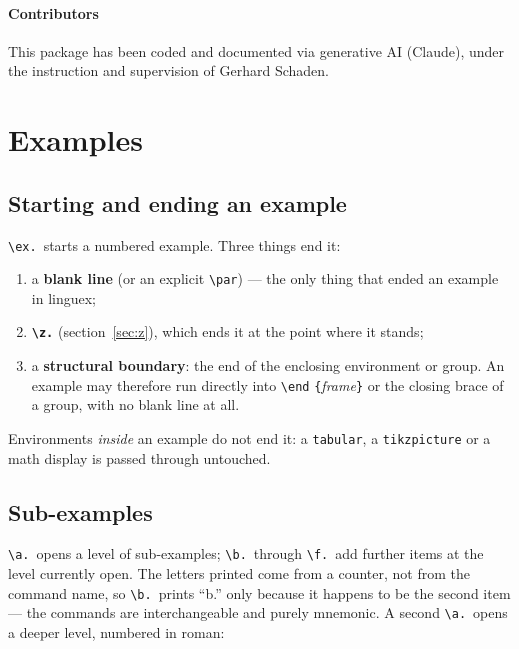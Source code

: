 \documentclass[11pt,a4paper]{article}
\newcommand{\cs}[1]{\texttt{\textbackslash #1}}
\newcommand{\pkg}[2][]{\textsf{#2}}
\newcommand{\meta}[1]{\textrm{\itshape\textlangle#1\textrangle}}
\newcommand{\marg}[1]{\penalty300 \texttt{\{}\meta{#1}\texttt{\}}}
\begin{document}
\paragraph{Contributors} This package has been coded and documented
via generative AI (Claude), under the instruction and supervision of
Gerhard Schaden.



\section{Examples}\label{sec:examples}

\subsection{Starting and ending an example}

\cs{ex.}\ starts a numbered example. Three things end it:

\begin{enumerate}[itemsep=2pt]
\item a \textbf{blank line} (or an explicit \cs{par}) --- the only thing that ended an example in \pkg{linguex};
\item \textbf{\cs{z.}} (section~\ref{sec:z}), which ends it at the point
  where it stands;
\item a \textbf{structural boundary}: the end of the enclosing environment
  or group. An example may therefore run directly into
  \cs{end}\marg{frame} or the closing brace of a group, with no blank line
  at all.
\end{enumerate}

\noindent Environments \emph{inside} an example do not end it: a
\texttt{tabular}, a \texttt{tikzpicture} or a math display is passed
through untouched.

\subsection{Sub-examples}

\cs{a.}\ opens a level of sub-examples; \cs{b.}\ through \cs{f.}\ add
further items at the level currently open. The letters printed come from a
counter, not from the command name, so \cs{b.}\ prints ``b.'' only because
it happens to be the second item --- the commands are interchangeable and
purely mnemonic. A second \cs{a.}\ opens a deeper level, numbered in roman:
\end{document}
